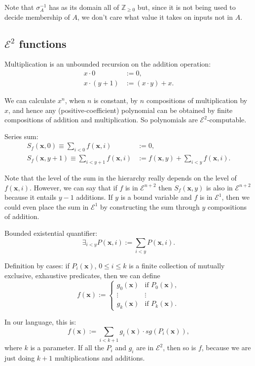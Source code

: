 \documentclass[a4paper]{article}
\newcommand{\grz}[1]{$\mathcal{E}^{#1}$}	%
\newcommand{\ZZ}{\mathbb{Z}}
\newcommand{\xvec}{\mathbf{x}}	%
\newcommand{\recur}[1]{\begin{equation} \begin{split} #1 \end{split} \end{equation}}	%
\theoremstyle{plain}
\theoremstyle{definition}
\begin{document}
Note that $\sigma_A^{-1}$ has as its domain all of $\ZZ_{\geq 0}$ but, since it is not being used to decide membership of $A$, we don't care what value it takes on inputs not in $A$.

\subsection{\grz{2} functions}
Multiplication is an unbounded recursion on the addition operation:
\recur{
	x \cdot 0 &:= 0,				\\
	x \cdot (y+1) &:= (x \cdot y) + x.
}

We can calculate $x^n$, when $n$ is constant, by $n$ compositions of multiplication by $x$, and hence any (positive-coefficient) polynomial can be obtained by finite compositions of addition and multiplication. So polynomials are \grz{2}-computable.

Series sum:
\recur{
	S_f(\xvec,0) \equiv \sum_{i < 0} f(\xvec, i) &:= 0,		\\
	S_f(\xvec,y+1) \equiv \sum_{i < y+1} f(\xvec,i) &:= f(\xvec,y) + \sum_{i < y} f(\xvec,i).
}

Note that the level of the sum in the hierarchy really depends on the level of $f(\xvec,i)$. However, we can say that if $f$ is in \grz{n+2} then $S_f(\xvec,y)$ is also in \grz{n+2} because it entails $y-1$ additions. If $y$ is a bound variable and $f$ is in \grz{1}, then we could even place the sum in \grz{1} by constructing the sum through $y$ compositions of addition.

Bounded existential quantifier:
\begin{equation} \exists_{i < y} P(\xvec,i) := \sum_{i < y} P(\xvec,i). \end{equation}


Definition by cases: if  $P_i(\xvec)$, $0 \leq i \leq k$ is a finite collection of mutually exclusive, exhaustive predicates, then we can define
\[ f(\xvec) := \begin{cases}
	g_0(\xvec) & \textrm{if }P_0(\xvec),	\\
	\vdots & \vdots	\\
	g_k(\xvec) & \textrm{if } P_k(\xvec).
\end{cases} \]

In our language, this is:
\begin{equation} f(\xvec) := \sum_{i < k+1} g_i(\xvec) \cdot sg(P_i(\xvec)), \end{equation}
where $k$ is a parameter. If all the $P_i$ and $g_i$ are in \grz{2}, then so is $f$, because we are just doing $k+1$ multiplications and additions.
\end{document}
